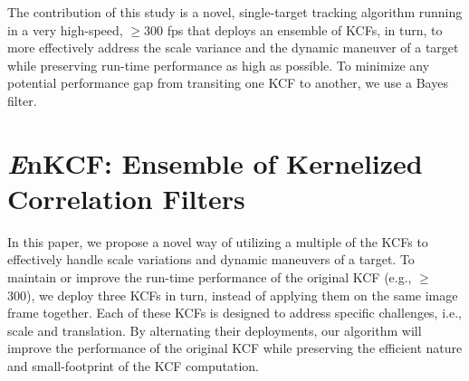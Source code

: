 \documentclass[10pt,twocolumn,letterpaper]{article}
\begin{document}
The contribution of this study is a novel, single-target tracking
algorithm running in a very high-speed, $\geq 300$ fps that deploys an
ensemble of KCFs, in turn, to more effectively address the scale
variance and the dynamic maneuver of a target while preserving
run-time performance as high as possible. To minimize any potential
performance gap from transiting one KCF to another, we use a Bayes
filter.

\section{{\it E}nKCF: Ensemble of Kernelized Correlation Filters}
In this paper, we propose a novel way of utilizing a multiple of the
KCFs \cite{henriques2015high} to effectively handle scale variations
and dynamic maneuvers of a target. To maintain or improve the run-time
performance of the original KCF (e.g., $\ge$ 300), we deploy three
KCFs in turn, instead of applying them on the same image frame
together. Each of these KCFs is designed to address specific
challenges, i.e., scale and translation. By alternating their
deployments, our algorithm will improve the performance of the
original KCF while preserving the efficient nature and small-footprint
of the KCF computation.
\end{document}
